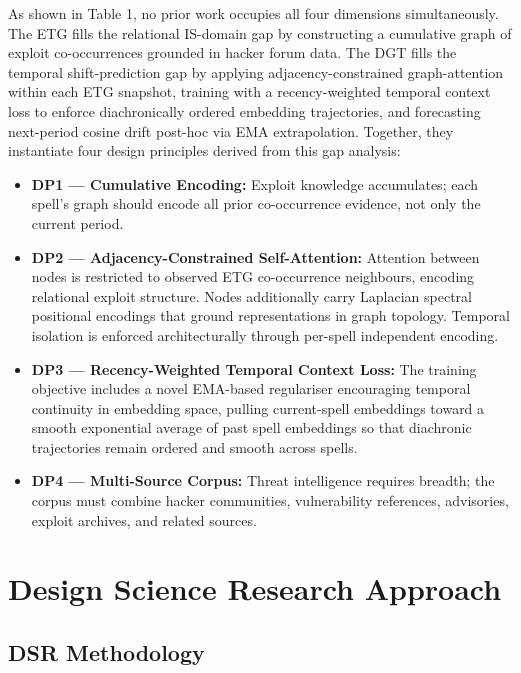 \documentclass[12pt]{article}
\begin{document}
As shown in Table 1, no prior work occupies all four dimensions simultaneously. The ETG fills the relational IS-domain gap by constructing a cumulative graph of exploit co-occurrences grounded in hacker forum data. The DGT fills the temporal shift-prediction gap by applying adjacency-constrained graph-attention within each ETG snapshot, training with a recency-weighted temporal context loss to enforce diachronically ordered embedding trajectories, and forecasting next-period cosine drift post-hoc via EMA extrapolation. Together, they instantiate four design principles derived from this gap analysis:

\begin{itemize}
  \item \textbf{DP1 --- Cumulative Encoding:} Exploit knowledge accumulates; each spell's graph should encode all prior co-occurrence evidence, not only the current period.
  \item \textbf{DP2 --- Adjacency-Constrained Self-Attention:} Attention between nodes is restricted to observed ETG co-occurrence neighbours, encoding relational exploit structure. Nodes additionally carry Laplacian spectral positional encodings that ground representations in graph topology. Temporal isolation is enforced architecturally through per-spell independent encoding.
  \item \textbf{DP3 --- Recency-Weighted Temporal Context Loss:} The training objective includes a novel EMA-based regulariser encouraging temporal continuity in embedding space, pulling current-spell embeddings toward a smooth exponential average of past spell embeddings so that diachronic trajectories remain ordered and smooth across spells.
  \item \textbf{DP4 --- Multi-Source Corpus:} Threat intelligence requires breadth; the corpus must combine hacker communities, vulnerability references, advisories, exploit archives, and related sources.
\end{itemize}

\section{Design Science Research Approach}
\bodyfont

\subsection{DSR Methodology}
\end{document}
